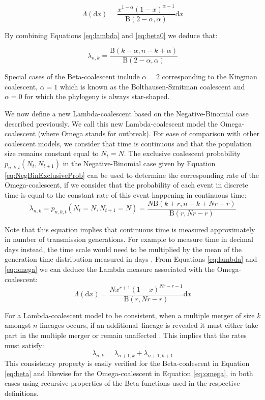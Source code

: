 \documentclass{article}
\renewcommand{\eqref}[1]{\ref{#1}}
\begin{document}
\begin{equation}
\Lambda(\mathrm{d}x)=\frac{x^{1-\alpha}(1-x)^{\alpha-1}}{\mathrm{B}(2-\alpha,\alpha)}\mathrm{d}x
\label{eq:beta0}
\end{equation}

By combining Equations \eqref{eq:lambda} and \eqref{eq:beta0} we deduce that:

\begin{equation}
\lambda_{n,k}=\frac{\mathrm{B}(k-\alpha,n-k+\alpha)}{\mathrm{B}(2-\alpha,\alpha)}
\label{eq:beta}
\end{equation}

Special cases of the Beta-coalescent 
include $\alpha=2$ corresponding to the Kingman coalescent,
$\alpha=1$ which is known as the Bolthausen-Sznitman coalescent
and $\alpha=0$ for which the phylogeny is always star-shaped.

We now define a new Lambda-coalescent based on the Negative-Binomial case described previously. We call this new Lambda-coalescent model the Omega-coalescent (where Omega stands
for outbreak).
For ease of comparison with other coalescent models, we consider that time is continuous
and that the population size remains constant equal to $N_t=N$. 
The exclusive coalescent probability $p_{n,k,t}(N_t, N_{t+1})$ in the Negative-Binomial case 
given by Equation \eqref{eq:NegBinExclusiveProb} can be used to determine the corresponding 
rate of the  Omega-coalescent, if we consider that the probability of each event in discrete time
is equal to the constant rate of this event happening in continuous time: 
\begin{equation}
\lambda_{n,k}=p_{n,k,t}(N_t=N, N_{t+1}=N)=\frac{N \mathrm{B}(k+r, n-k+N r-r)}{\mathrm{B}(r, N r-r)}
\label{eq:omega}
\end{equation}

Note that this equation implies that continuous time is measured
approximately in number of transmission generations. 
For example to measure time in decimal days instead, the time scale
would need to be multiplied by the mean of the generation time 
distribution measured in days \citep{Svensson2007}.
From Equations \ref{eq:lambda} and \ref{eq:omega} we can deduce the 
Lambda measure associated with the Omega-coalescent:
\begin{equation}
\Lambda(\mathrm{d}x)=\frac{Nx^{r+1}(1-x)^{Nr-r-1}}{\mathrm{B}(r,Nr-r)}\mathrm{d}x
\label{eq:omega0}
\end{equation}

For a Lambda-coalescent model to be consistent, 
when a multiple merger of size $k$ amongst $n$ lineages occurs, if 
an additional lineage is revealed it must either take part in the multiple merger or 
remain unaffected \citep{berestyckiRecentProgressCoalescent2009,miropinaEstimatingLambdaMeasure2023}.
This implies that the rates must satisfy: 
\begin{equation}
\lambda_{n,k}=\lambda_{n+1,k}+\lambda_{n+1,k+1}
\label{eq:consistency}
\end{equation}
This consistency property is easily verified for the Beta-coalescent in Equation \eqref{eq:beta}
and likewise for the Omega-coalescent in Equation \eqref{eq:omega}, in both
cases using recursive properties of the Beta functions used in the respective definitions.
\end{document}
